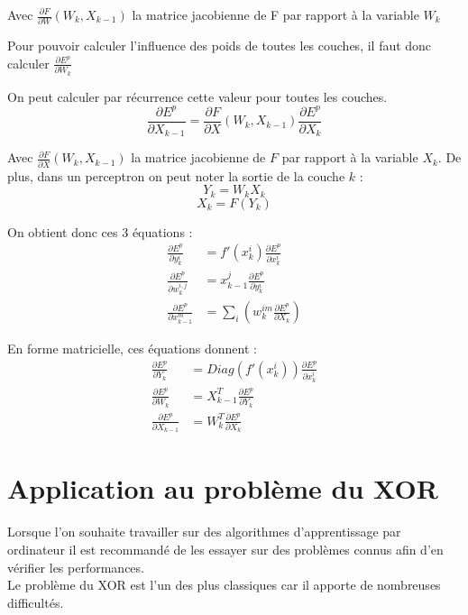 Avec $\frac{\partial F}{\partial W}(W_k, X_{k-1})$ la matrice jacobienne de F par rapport à la variable $W_k$

Pour pouvoir calculer l'influence des poids de toutes les couches, il faut donc calculer $\frac{\partial E^p}{\partial W_k}$

On peut calculer par récurrence cette valeur pour toutes les couches.
\[
	\frac{\partial E^p}{\partial X _{k-1}} = \frac{\partial F}{\partial X}(W_k, X_{k-1})\frac{\partial E^p}{\partial X_k}
\]

Avec $\frac{\partial F}{\partial X }(W_k, X_{k-1})$ la matrice jacobienne de $F$ par rapport à la variable $X_k$. De plus, dans un perceptron on peut noter la sortie de la couche $k$ : 
\[
Y_k = W_k X_k \]
\[
X_k = F(Y_k)
\]

On obtient donc ces 3 équations : 
\begin{align*}
\frac{\partial E^p}{\partial y_k^i} &= f'(x_k^i)\frac{\partial E^p}{\partial x_k^i} \\
\frac{\partial E^p}{\partial w_k^{i,j}}&= x^j_{k-1} \frac{\partial E^p}{\partial y_k^i}\\
\frac{\partial E^p}{\partial x_{k-1}^m} &= \sum_i(w_k^{im}\frac{\partial E^p}{\partial X_k})
\end{align*}

En forme matricielle, ces équations donnent :
\begin{align*}
\frac{\partial E^p}{\partial Y_k} &= Diag(f'(x_k^i))\frac{\partial E^p}{\partial x_k^i} \\
\frac{\partial E^p}{\partial W_k}&= X^T_{k-1} \frac{\partial E^p}{\partial Y_k}\\
\frac{\partial E^p}{\partial X_{k-1}} &= W_k^T\frac{\partial E^p}{\partial X_k}
\end{align*}

\section{Application au problème du XOR}

\paragraph*{}
Lorsque l'on souhaite travailler sur des algorithmes d'apprentissage par ordinateur il est recommandé de les essayer sur des problèmes connus afin d'en vérifier les performances. \\
Le problème du XOR est l'un des plus classiques car il apporte de nombreuses difficultés.\\

